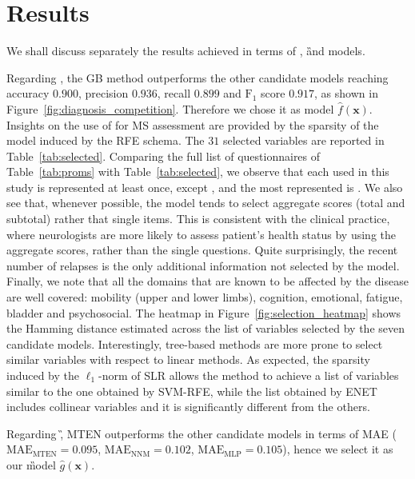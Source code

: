 \section{Results}\label{sec:aism_results}

We shall discuss separately the results achieved in terms of \F, \G and \FOG models.

Regarding \F, the GB method outperforms the other candidate models reaching accuracy $0.900$, precision $0.936$, recall $0.899$ and $\text{F}_1$ score $0.917$, as shown in Figure~\ref{fig:diagnosis_competition}. Therefore we chose it as \F model $\hat{f}(\bm{x})$.
Insights on the use of \PCOs for MS assessment are provided by the sparsity of the \F model induced by the RFE schema.
The $31$ selected variables are reported in Table~\ref{tab:selected}.
Comparing the full list of \PCO questionnaires of Table~\ref{tab:proms} with Table~\ref{tab:selected}, we observe that each \PCO used in this study is represented at least once, except \EDINB, and the most represented is \FIM.
We also see that, whenever possible, the model tends to select aggregate scores (total and subtotal) rather that single items. This is consistent with the clinical practice, where neurologists are more likely to assess patient's health status by using the aggregate scores, rather than the single questions.
Quite surprisingly, the recent number of relapses is the only additional information not selected by the model.
Finally, we note that all the domains that are known to be affected by the disease are well covered: mobility (upper and lower limbs), cognition, emotional, fatigue, bladder and psychosocial.
The heatmap in Figure~\ref{fig:selection_heatmap} shows the Hamming distance estimated across the list of variables selected by the seven \F candidate models. Interestingly, tree-based methods are more prone to select similar variables with respect to linear methods. As expected, the sparsity induced by the $\ell_1$-norm of SLR allows the method to achieve a list of variables similar to the one obtained by SVM-RFE, while the list obtained by ENET includes collinear variables and it is significantly different from the others.

Regarding \G, MTEN outperforms the other candidate models in terms of MAE ( $\text{MAE}_{\text{MTEN}}=0.095$, $\text{MAE}_{\text{NNM}}=0.102$, $\text{MAE}_{\text{MLP}}=0.105$), hence we select it as our \G model $\hat{g}(\bm{x})$.


